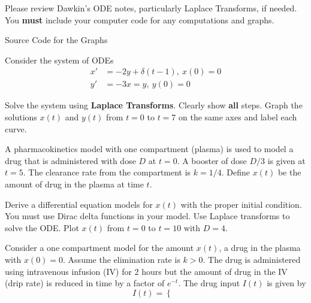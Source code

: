 \documentclass[
	number={4},
	title={Pharmacokinetics}
]{math486homework}
\begin{document}
\maketitle

\noindent Please review Dawkin's ODE notes, particularly Laplace Transforms, if needed.
You \textbf{must} include your computer code for any computations and graphs.

\begin{listing}[p]
	\caption{Source Code for the Graphs}
	\label{lst:source-code}
\end{listing}

\begin{problems}
	\problem Consider the system of ODEs
	\begin{equation*}
	\begin{aligned}
		x' &= -2y + \delta(t-1),\ x(0) = 0\\
		y' &= -3x = y,\ y(0) = 0
	\end{aligned}
	\end{equation*}
	\begin{problems}
		\subproblem Solve the system using \textbf{Laplace Transforms}.
		Clearly show \textbf{all} steps. 
		\subproblem Graph the solutions $x(t)$ and $y(t)$ from $t=0$ to $t=7$ on the same axes and label each curve. 
	\end{problems}
	\problem A pharmacokinetics model with one compartment (plasma) is used to model a drug that is administered with dose $D$ at $t=0$.
	A booster of dose $D/3$ is given at $t=5$.
	The clearance rate from the compartment is $k=1/4$.
	Define $x(t)$ be the amount of drug in the plasma at time $t$.
	\begin{problems}
		\subproblem Derive a differential equation models for $x(t)$ with the proper initial condition.
		You must use Dirac delta functions in your model. \addanswer{Problem-2a}
		\subproblem Use Laplace transforms to solve the ODE. \addanswer{Problem-2b}
		\subproblem Plot $x(t)$ from $t=0$ to $t=10$ with $D=4$. \addanswer{Problem-2c}
	\end{problems}
	\problem Consider a one compartment model for the amount $x(t)$, a drug in the plasma with $x(0) = 0$.
	Assume the elimination rate is $k > 0$.
	The drug is administered using intravenous infusion (IV) for 2 hours but the amount of drug in the IV (drip rate) is reduced in time by a factor of $e^{-t}$.
	The drug input $I(t)$ is given by
	\[ I(t) = \left\{ \begin{array}{ll}

\end{array}\]
\end{problems}
\end{document}
